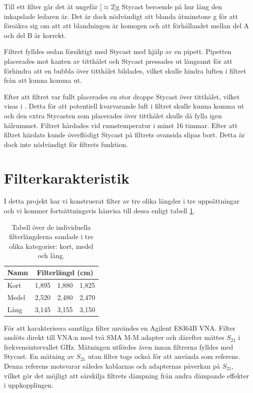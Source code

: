 \documentclass[main.tex]{subfiles}
\begin{document}
Till ett filter går det åt ungefär \unit[$\approx 2$]{g} Stycast beroende på hur lång den inkapslade ledaren är. Det är dock nödvändigt att blanda åtminstone \unit[10]{g} för att försäkra sig om att att blandningen är homogen och att förhållandet mellan del A och del B är korrekt. 

Filtret fylldes sedan försiktigt med Stycast med hjälp av en pipett. Pipetten placerades mot kanten av titthålet och Stycast pressades ut långsamt för att förhindra att en bubbla över titthålet bildades, vilket skulle hindra luften i filtret från att kunna komma ut. 

Efter att filtret var fullt placerades en stor droppe Stycast över titthålet, vilket visas i . Detta för att potentiell kvarvarande luft i filtret skulle kunna komma ut och den extra Stycasten som placerades över titthålet skulle då fylla igen hålrummet. Filtret härdades vid rumstemperatur i minst 16 timmar. Efter att filtret härdats kunde överflödigt Stycast på filtrets ovansida slipas bort. Detta är dock inte nödvändigt för filtrets funktion.


\section{Filterkarakteristik}
\label{sec:filter_kar}
I detta projekt har vi konstruerat filter av tre olika längder i tre uppsättningar och vi kommer fortsättningsvis hänvisa till dessa enligt tabell \ref{tab:filter_list}.

\begin{table}[h]
    \centering
    \caption{Tabell över de individuella filterlängderna samlade i tre olika kategorier: kort, medel och lång.}
    \label{tab:filter_list}
    \begin{tabular}{llll}\toprule
        Namn & \multicolumn{3}{c}{Filterlängd (\unit{cm})} \\
        \midrule
        Kort & 1,895 & 1,880 & 1,825 \\
        Medel & 2,520 & 2,480 & 2,470 \\
        Lång & 3,145 & 3,155 & 3,150\\
        \bottomrule
    \end{tabular}
\end{table}

För att karakterisera samtliga filter användes en Agilent E8364B VNA. Filter anslöts direkt till VNA:n med två SMA M-M adapter och därefter mättes $S_{21}$ i frekvensintervallet \unit[1-50]{GHz}. Mätningen utfördes även innan filtrerna fylldes med Stycast. En mätning av $S_{21}$ utan filter togs också för att använda som referens. Denna referens motsvarar således kablarnas och adapternas påverkan på $S_{21}$, vilket gör det möjligt att särskilja filtrets dämpning från andra dämpande effekter i uppkopplingen.%
\end{document}
